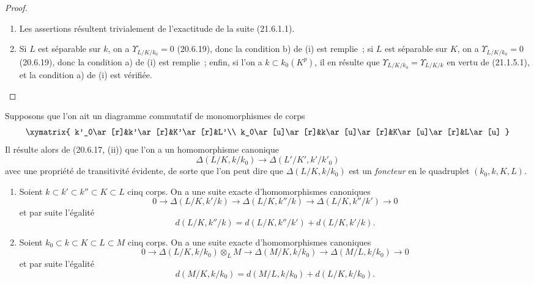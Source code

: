 \begin{proof}
\begin{enumerate}
  \item[(i)] Les assertions résultent trivialement de l'exactitude de la suite
  (21.6.1.1).
  \item[(ii)] Si $L$ est séparable sur $k$, on a
  $\Upsilon_{L/K/k_0}=0$ (20.6.19), donc la condition b) de (i) est remplie~;
  si $L$ est séparable sur $K$, on a
  $\Upsilon_{L/K/k_0}=0$ (20.6.19), donc la condition a) de (i) est remplie~;
  enfin, si l'on a $k\subset k_0(K^p)$, il en résulte que
  $\Upsilon_{L/K/k_0}=\Upsilon_{L/K/k}$ en vertu de (21.1.5.1), et la
  condition a) de (i) est vérifiée.
\end{enumerate}
\end{proof}
\begin{env}[21.6.3]
\label{0.21.6.3-fr}
Supposons que l'on ait un diagramme commutatif de monomorphismes de corps
\[
\xymatrix{
 k'_0\ar[r]&k'\ar[r]&K'\ar[r]&L'\\
 k_0\ar[u]\ar[r]&k\ar[u]\ar[r]&K\ar[u]\ar[r]&L\ar[u]
}
\]
Il résulte alors de (20.6.17, (ii)) que l'on a un homomorphisme canonique
\begin{equation}
\tag{21.6.3.1}
\label{0.21.6.3.1-fr}
\Delta(L/K,k/k_0)\longrightarrow\Delta(L'/K',k'/k'_0)
\end{equation}
avec une propriété de transitivité évidente, de sorte que l'on peut dire que
$\Delta(L/K,k/k_0)$ est un \emph{foncteur} en le quadruplet
$(k_0,k,K,L)$.
\end{env}

\begin{proposition}[21.6.4]
\label{0.21.6.4-fr}
\begin{enumerate}
  \item[\rm (i)] Soient $k\subset k'\subset k''\subset K\subset L$ cinq corps.
  On a une suite exacte d'homomorphismes canoniques
\begin{equation}
\tag{21.6.4.1}
\label{0.21.6.4.1-fr}
0\to\Delta(L/K,k'/k)\to\Delta(L/K,k''/k)\to\Delta(L/K,k''/k')\to0
\end{equation}
et par suite l'égalité
\begin{equation}
\tag{21.6.4.2}
\label{0.21.6.4.2-fr}
d(L/K,k''/k)=d(L/K,k''/k')+d(L/K,k'/k).
\end{equation}
  \item[\rm (ii)] Soient $k_0\subset k\subset K\subset L\subset M$ cinq corps.
  On a une suite exacte d'homomorphismes canoniques
\begin{equation}
\tag{21.6.4.3}
\label{0.21.6.4.3-fr}
0\to\Delta(L/K,k/k_0)\otimes_LM\to\Delta(M/K,k/k_0)
\to\Delta(M/L,k/k_0)\to0
\end{equation}
et par suite l'égalité
\begin{equation}
\tag{21.6.4.4}
\label{0.21.6.4.4-fr}
d(M/K,k/k_0)=d(M/L,k/k_0)+d(L/K,k/k_0).
\end{equation}
\end{enumerate}
\end{proposition}

